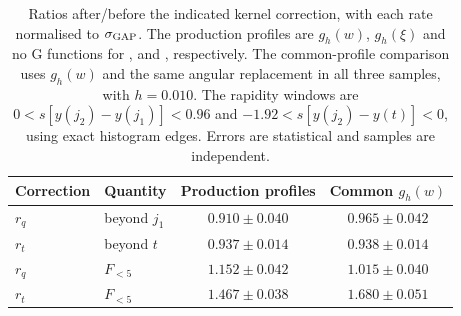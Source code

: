 \begin{table}[t]
  \centering
  \begin{tabular}{@{}llcc@{}}
    \toprule
    Correction & Quantity & Production profiles & Common $g_h(w)$\\
    \midrule
    $r_q$ & beyond $j_1$ & $0.910\pm0.040$ & $0.965\pm0.042$\\
    $r_t$ & beyond $t$ & $0.937\pm0.014$ & $0.938\pm0.014$\\
    $r_q$ & $F_{<5}$ & $1.152\pm0.042$ & $1.015\pm0.040$\\
    $r_t$ & $F_{<5}$ & $1.467\pm0.038$ & $1.680\pm0.051$\\
    \bottomrule
  \end{tabular}
  \caption{Ratios after/before the indicated kernel correction, with each rate normalised to $\sigma_{\rm GAP}$. The production profiles are $g_h(w)$, $g_h(\xi)$ and no G functions for \loc, \locq and \locqt, respectively. The common-profile comparison uses $g_h(w)$ and the same angular replacement in all three samples, with $h=0.010$. The rapidity windows are $0<s[y(j_2)-y(j_1)]<0.96$ and $-1.92<s[y(j_2)-y(t)]<0$, using exact histogram edges. Errors are statistical and samples are independent.}
  \label{tab:commong}
\end{table}
